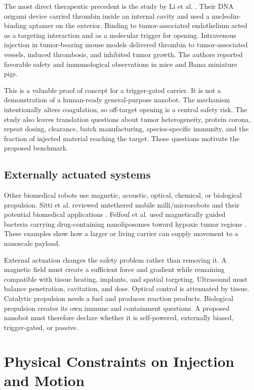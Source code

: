 \documentclass[conference]{IEEEtran}
\begin{document}
The most direct therapeutic precedent is the study by Li et al. \cite{li2018}. Their DNA origami device carried thrombin inside an internal cavity and used a nucleolin-binding aptamer on the exterior. Binding to tumor-associated endothelium acted as a targeting interaction and as a molecular trigger for opening. Intravenous injection in tumor-bearing mouse models delivered thrombin to tumor-associated vessels, induced thrombosis, and inhibited tumor growth. The authors reported favorable safety and immunological observations in mice and Bama miniature pigs.

This is a valuable proof of concept for a trigger-gated carrier. It is not a demonstration of a human-ready general-purpose nanobot. The mechanism intentionally alters coagulation, so off-target opening is a central safety risk. The study also leaves translation questions about tumor heterogeneity, protein corona, repeat dosing, clearance, batch manufacturing, species-specific immunity, and the fraction of injected material reaching the target. Those questions motivate the proposed benchmark.

\subsection{Externally actuated systems}
Other biomedical robots use magnetic, acoustic, optical, chemical, or biological propulsion. Sitti et al. reviewed untethered mobile milli/microrobots and their potential biomedical applications \cite{sitti2015}. Felfoul et al. used magnetically guided bacteria carrying drug-containing nanoliposomes toward hypoxic tumor regions \cite{felfoul2016}. These examples show how a larger or living carrier can supply movement to a nanoscale payload.

External actuation changes the safety problem rather than removing it. A magnetic field must create a sufficient force and gradient while remaining compatible with tissue heating, implants, and spatial targeting. Ultrasound must balance penetration, cavitation, and dose. Optical control is attenuated by tissue. Catalytic propulsion needs a fuel and produces reaction products. Biological propulsion creates its own immune and containment questions. A proposed nanobot must therefore declare whether it is self-powered, externally biased, trigger-gated, or passive.

\section{Physical Constraints on Injection and Motion}
\label{sec:physics}
\end{document}
